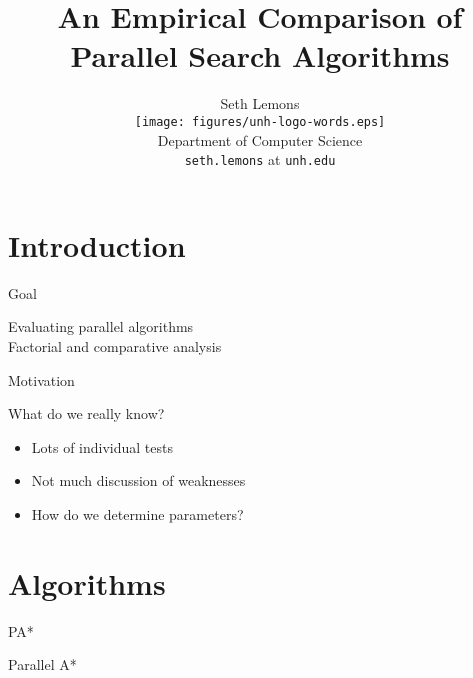 \documentclass[style=unh]{powerdot}
\title{An Empirical Comparison of Parallel Search Algorithms}
\author{Seth Lemons \vspace{0.2in} \\
  \texttt{[image: figures/unh-logo-words.eps]} \\
  Department of Computer Science \\
  {\tt seth.lemons} at {\tt unh.edu}}
\date{\mbox{}}
\begin{document}
\maketitle


\section[slide=false]{Introduction}


\begin{slide}{Goal}
  \vspace{1in}
  \begin{center}
    Evaluating parallel algorithms \\
    {\tiny Factorial and comparative analysis}
  \end{center}

\end{slide}


\begin{slide}{Motivation}
    \begin{center}
      What do we really know?
    \end{center}

    \begin{itemize}
    \item Lots of individual tests
    \item Not much discussion of weaknesses
    \item How do we determine parameters?
    \end{itemize}
\end{slide}


\section{Algorithms}


\begin{slide}{PA*}
  \vspace{.2in}
  \begin{center}
    Parallel A*
  \end{center}

  \vspace{.1in}

\end{slide}
\end{document}
